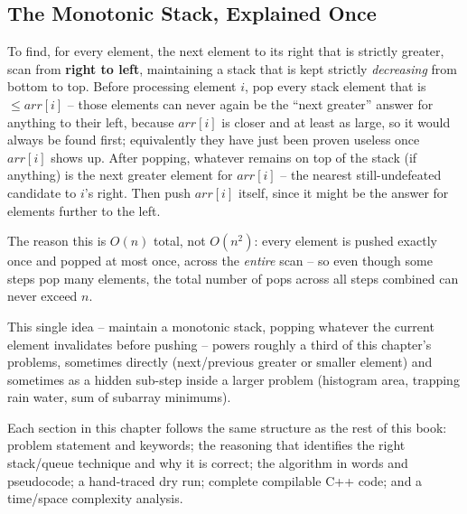 \subsection*{The Monotonic Stack, Explained Once}

\begin{ideabox}
To find, for every element, the next element to its right that is
strictly greater, scan from \textbf{right to left}, maintaining a stack
that is kept strictly \emph{decreasing} from bottom to top. Before
processing element $i$, pop every stack element that is $\le
\textit{arr}[i]$ -- those elements can never again be the ``next greater''
answer for anything to their left, because $\textit{arr}[i]$ is closer and
at least as large, so it would always be found first; equivalently they have
just been proven useless once $\textit{arr}[i]$ shows up. After popping,
whatever remains on top of the stack (if anything) is the next greater
element for $\textit{arr}[i]$ -- the nearest still-undefeated candidate
to $i$'s right. Then push $\textit{arr}[i]$ itself, since it might be the
answer for elements further to the left.

The reason this is $O(n)$ total, not $O(n^2)$: every element is pushed
exactly once and popped at most once, across the \emph{entire} scan -- so
even though some steps pop many elements, the total number of pops across
all steps combined can never exceed $n$.
\end{ideabox}

This single idea -- maintain a monotonic stack, popping whatever the
current element invalidates before pushing -- powers roughly a third of
this chapter's problems, sometimes directly (next/previous greater or
smaller element) and sometimes as a hidden sub-step inside a larger
problem (histogram area, trapping rain water, sum of subarray minimums).

Each section in this chapter follows the same structure as the rest of
this book: problem statement and keywords; the reasoning that identifies
the right stack/queue technique and why it is correct; the algorithm in
words and pseudocode; a hand-traced dry run; complete compilable C++ code;
and a time/space complexity analysis.

\newpage


